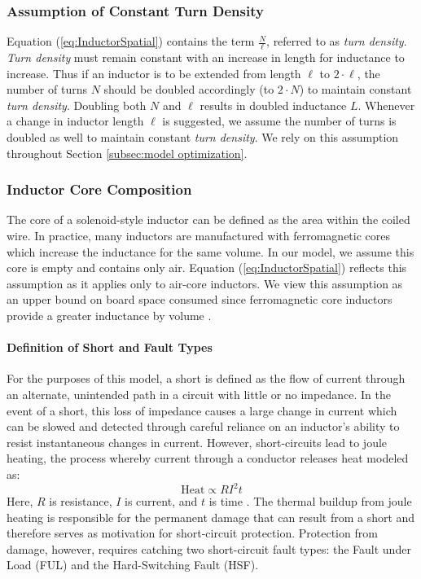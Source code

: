 \subsubsection{Assumption of Constant Turn Density} \label{ssec:Assumption of Constant}
Equation (\ref{eq:InductorSpatial}) contains the term $\frac{N}{\ell}$, referred to as \textit{turn density}. \textit{Turn density} must remain constant with an increase in length for inductance to increase. Thus if an inductor is to be extended from length $\ell$ to $2\cdot \ell$, the number of turns $N$ should be doubled accordingly (to $2\cdot N$) to maintain constant \textit{turn density}. Doubling both $N$ and $\ell$ results in doubled inductance $L$. Whenever a change in inductor length $\ell$ is suggested, we assume the number of turns is doubled as well to maintain constant \textit{turn density}. We rely on this assumption throughout Section \ref{subsec:model optimization}.
\subsubsection{Inductor Core Composition}
The core of a solenoid-style inductor can be defined as the area within the coiled wire. In practice, many inductors are manufactured with ferromagnetic cores which increase the inductance for the same volume. In our model, we assume this core is empty and contains only air. Equation (\ref{eq:InductorSpatial}) reflects this assumption as it applies only to air-core inductors. We view this assumption as an upper bound on board space consumed since ferromagnetic core inductors provide a greater inductance by volume \cite{NiFe}.

\paragraph{Definition of Short and Fault Types}
For the purposes of this model, a short is defined as the flow of current through an alternate, unintended path in a circuit with little or no impedance. In the event of a short, this loss of impedance causes a large change in current which can be slowed and detected through careful reliance on an inductor's ability to resist instantaneous changes in current. However, short-circuits lead to joule heating, the process whereby current through a conductor releases heat modeled as:
\begin{equation}\label{eq:JouleHeating}
\text{Heat} \propto R I^{2} t
\end{equation}
Here, $R$ is resistance, $I$ is current, and $t$ is time \cite{uniphy}. The thermal buildup from joule heating is responsible for the permanent damage that can result from a short and therefore serves as motivation for short-circuit protection. Protection from damage, however, requires catching two short-circuit fault types: the Fault under Load (FUL) and the Hard-Switching Fault (HSF).

